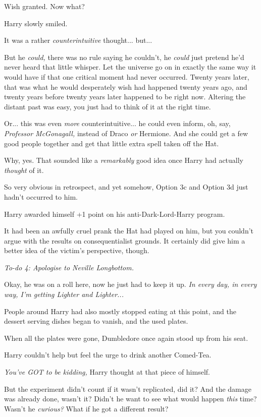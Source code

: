 Wish granted. Now what?

Harry slowly smiled.

It was a rather \emph{counterintuitive} thought... but...

But he \emph{could,} there was no rule saying he couldn't, he \emph{could} just pretend he'd never heard that little whisper. Let the universe go on in exactly the same way it would have if that one critical moment had never occurred. Twenty years later, that was what he would desperately wish had happened twenty years ago, and twenty years before twenty years later happened to be right now. Altering the distant past was easy, you just had to think of it at the right time.

Or... this was even \emph{more} counterintuitive... he could even inform, oh, say, \emph{Professor McGonagall,} instead of Draco \emph{or} Hermione. And she could get a few good people together and get that little extra spell taken off the Hat.

Why, yes. That sounded like a \emph{remarkably} good idea once Harry had actually \emph{thought} of it.

So very obvious in retrospect, and yet somehow, Option 3c and Option 3d just hadn't occurred to him.

Harry awarded himself +1 point on his anti-Dark-Lord-Harry program.

It had been an awfully cruel prank the Hat had played on him, but you couldn't argue with the results on consequentialist grounds. It certainly did give him a better idea of the victim's perspective, though.

\emph{To-do 4: Apologise to Neville Longbottom.}

Okay, he was on a roll here, now he just had to keep it up. \emph{In every day, in every way, I'm getting Lighter and Lighter...}

People around Harry had also mostly stopped eating at this point, and the dessert serving dishes began to vanish, and the used plates.

When all the plates were gone, Dumbledore once again stood up from his seat.

Harry couldn't help but feel the urge to drink another Comed-Tea.

\emph{You've GOT to be kidding,} Harry thought at that piece of himself.

But the experiment didn't count if it wasn't replicated, did it? And the damage was already done, wasn't it? Didn't he want to see what would happen \emph{this} time? Wasn't he \emph{curious?} What if he got a different result?

